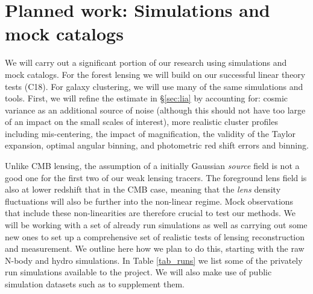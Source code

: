 \section{Planned work: Simulations and mock catalogs}\label{sec:sim}

We will carry out a significant portion of our research using
 simulations and mock catalogs.
For the forest lensing we will build on our successful
linear theory tests (C18). For galaxy clustering,
we will use many of the same simulations and tools. 
First, we will refine the estimate 
in \S\ref{sec:lia} by accounting for: cosmic variance as an
additional source of noise (although this should not have too large
of an impact on the small scales of interest), more realistic cluster
profiles including mis-centering, the impact of magnification, the
validity of the Taylor expansion, optimal angular binning, and
photometric red shift errors and binning.



Unlike CMB lensing, the assumption of a initially Gaussian {\it source}
field is not a good one for the first two of our weak lensing tracers. 
The foreground lens  field is also
at lower redshift that in the CMB case, meaning that the {\it lens}
density fluctuations will also be further into the non-linear regime. Mock
observations that include these non-linearities are therefore crucial
to test our methods. We will be working with a set of already run simulations
as well as carrying out some new ones to set up a comprehensive set
of realistic tests of lensing reconstruction and measurement. 
We outline  here how we plan to do this, starting
with the raw N-body and hydro simulations. In Table \ref{tab_runs} we list
some of the privately run simulations available to the project. We will
also make use of public simulation datasets such as \cite{giocoli2016}
 to supplement them.




